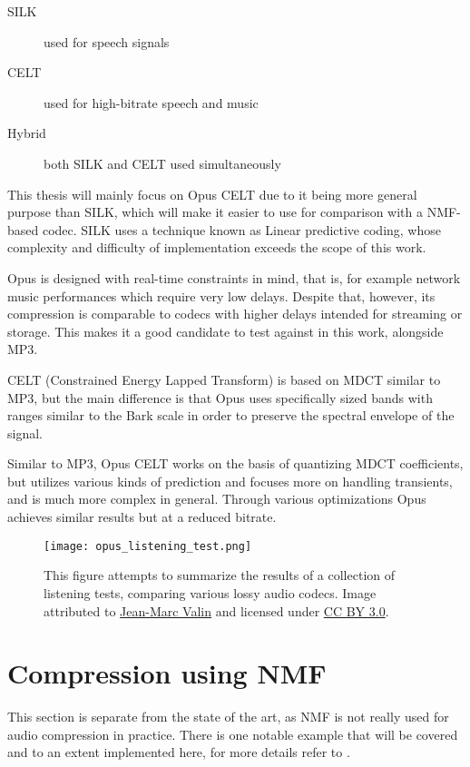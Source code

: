 \begin{description}
	\item[SILK] used for speech signals
	\item[CELT] used for high-bitrate speech and music
	\item[Hybrid] both SILK and CELT used simultaneously
\end{description}

This thesis will mainly focus on Opus CELT due to it being more general purpose than SILK, which will make it easier to use for comparison with a NMF-based codec. SILK uses a technique known as Linear predictive coding, whose complexity and difficulty of implementation exceeds the scope of this work.

Opus is designed with real-time constraints in mind, that is, for example network music performances which require very low delays. Despite that, however, its compression is comparable to codecs with higher delays intended for streaming or storage. This makes it a good candidate to test against in this work, alongside MP3.

CELT (Constrained Energy Lapped Transform) is based on MDCT similar to MP3, but the main difference is that Opus uses specifically sized bands with ranges similar to the Bark scale in order to preserve the spectral envelope of the signal.

Similar to MP3, Opus CELT works on the basis of quantizing MDCT coefficients, but utilizes various kinds of prediction and focuses more on handling transients, and is much more complex in general. Through various optimizations Opus achieves similar results but at a reduced bitrate.

\begin{figure}[ht]
	\caption[Comparison of various audio codecs]{This figure attempts to summarize the results of a collection of listening tests, comparing various lossy audio codecs. Image attributed to \href{http://opus-codec.org/comparison/}{Jean-Marc Valin} and licensed under \href{https://creativecommons.org/licenses/by/3.0/}{CC BY 3.0}.}
	\label{fig:opus_listening_test}
	\centering
	\texttt{[image: opus\_listening\_test.png]}
\end{figure}

\section{Compression using NMF}
This section is separate from the state of the art, as NMF is not really used for audio compression in practice. There is one notable example that will be covered and to an extent implemented here, for more details refer to \cite{nikunen_2010}.

